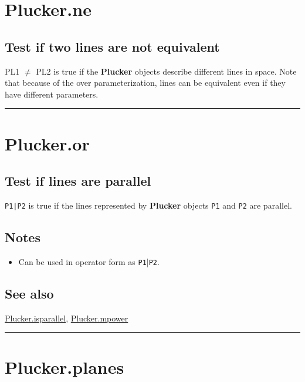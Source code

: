\hypertarget{Plucker.ne}{\section*{Plucker.ne}}
\subsection*{Test if two lines are not equivalent}


PL1 $\ne$ PL2 is true if the \textbf{\color{red} Plucker} objects describe different lines in
space.  Note that because of the over parameterization, lines can be
equivalent even if they have different parameters.

\vspace{1.5ex}\hrule

\hypertarget{Plucker.or}{\section*{Plucker.or}}
\subsection*{Test if lines are parallel}


\texttt{P1|P2} is true if the lines represented by \textbf{\color{red} Plucker} objects \texttt{P1}
and \texttt{P2} are parallel.


\subsection*{Notes}
\begin{itemize}
  \item Can be used in operator form as \texttt{P1}|\texttt{P2}.
\end{itemize}

\subsection*{See also}


\hyperlink{Plucker.isparallel}{\color{blue} Plucker.isparallel}, \hyperlink{Plucker.mpower}{\color{blue} Plucker.mpower}

\vspace{1.5ex}\hrule

\hypertarget{Plucker.planes}{\section*{Plucker.planes}}
